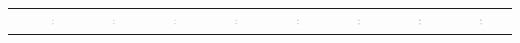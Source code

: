 \begin{table}
\begin{tabular}{|c|c|c|c|c|c|c|c|c|}
				& \includegraphics[width=0.08\textwidth]{pics/gates_symbol/buffer} & \includegraphics[width=0.08\textwidth]{pics/gates_symbol/not} & \includegraphics[width=0.08\textwidth]{pics/gates_symbol/and} & \includegraphics[width=0.08\textwidth]{pics/gates_symbol/nand} & \includegraphics[width=0.08\textwidth]{pics/gates_symbol/or} & \includegraphics[width=0.08\textwidth]{pics/gates_symbol/nor} & \includegraphics[width=0.08\textwidth]{pics/gates_symbol/exor} & \includegraphics[width=0.08\textwidth]{pics/gates_symbol/xnor} \\

\end{tabular}
\end{table}
